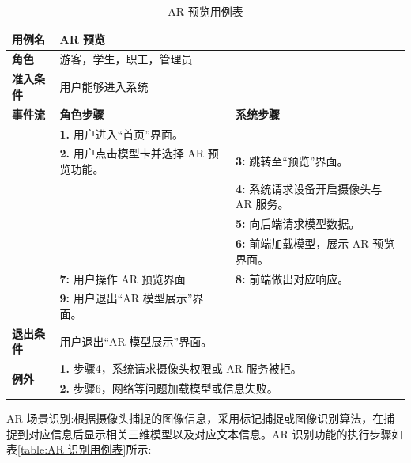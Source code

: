 \begin{table}[H]
  \centering
  \renewcommand\arraystretch{1.1}
  \small
  \caption{AR 预览用例表}
  \label{table:AR 预览用例表}
  \setlength{\tabcolsep}{4mm}
  \begin{tabular}{|p{2cm}|p{5.75cm}|p{5.75cm}|}
    \hline \textbf{用例名} & \multicolumn{2}{l|}{AR 预览} \\
    \hline \textbf{角色} & \multicolumn{2}{l|}{游客，学生，职工，管理员} \\
    \hline \textbf{准入条件} & \multicolumn{2}{l|}{用户能够进入系统} \\
    \hline \textbf{事件流} & \textbf{角色步骤} & \textbf{系统步骤} \\
    \hline \multirow{3}{*}{~} & \textbf{1.} 用户进入``首页''界面。  &    \\
    \cline{2-3} & \textbf{2.} 用户点击模型卡并选择 AR 预览功能。 & \textbf{3:} 跳转至``预览''界面。 \\
    \cline{2-3} &  & \textbf{4:} 系统请求设备开启摄像头与 AR 服务。 \\
    \cline{2-3} &  & \textbf{5:} 向后端请求模型数据。 \\
    \cline{2-3} &  & \textbf{6:} 前端加载模型，展示 AR 预览界面。 \\
    \cline{2-3} & \textbf{7:} 用户操作 AR 预览界面 & \textbf{8:} 前端做出对应响应。 \\
    \cline{2-3} & \textbf{9:} 用户退出``AR 模型展示''界面。 &  \\
    \hline \textbf{退出条件}  & \multicolumn{2}{l|}{用户退出``AR 模型展示''界面。} \\
    \hline \multirow{2}{*}{\textbf{例外}} & \multicolumn{2}{l|}{\textbf{1.} 步骤4，系统请求摄像头权限或 AR 服务被拒。} \\
    & \multicolumn{2}{l|}{\textbf{2.} 步骤6，网络等问题加载模型或信息失败。} \\
    \hline
  \end{tabular}
\end{table}

AR 场景识别:根据摄像头捕捉的图像信息，采用标记捕捉或图像识别算法，在捕捉到对应信息后显示相关三维模型以及对应文本信息。AR 识别功能的执行步骤如表\ref{table:AR 识别用例表}所示:


